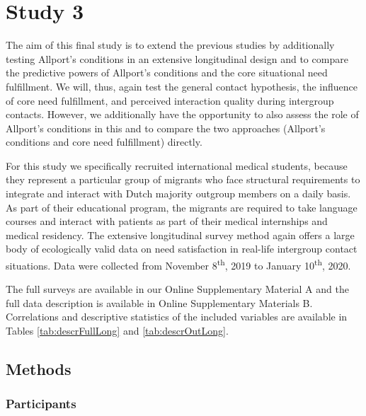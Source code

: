\documentclass[man, 12pt, a4paper]{apa7}
\theoremstyle{break}
\theoremstyle{plain}
\begin{document}
\section{Study 3}

The aim of this final study is to extend the previous studies by
additionally testing Allport's conditions in an extensive longitudinal
design and to compare the predictive powers of Allport's conditions and
the core situational need fulfillment. We will, thus, again test the
general contact hypothesis, the influence of core need fulfillment, and
perceived interaction quality during intergroup contacts. However, we
additionally have the opportunity to also assess the role of Allport's
conditions in this and to compare the two approaches (Allport's
conditions and core need fulfillment) directly.

For this study we specifically recruited international medical students,
because they represent a particular group of migrants who face
structural requirements to integrate and interact with Dutch majority
outgroup members on a daily basis. As part of their educational program,
the migrants are required to take language courses and interact with
patients as part of their medical internships and medical residency. The
extensive longitudinal survey method again offers a large body of
ecologically valid data on need satisfaction in real-life intergroup
contact situations. Data were collected from November
8\textsuperscript{th}, 2019 to January 10\textsuperscript{th}, 2020.

The full surveys are available in our Online Supplementary Material A
and the full data description is available in Online Supplementary
Materials B. Correlations and descriptive statistics of the included
variables are available in Tables \ref{tab:descrFullLong} and
\ref{tab:descrOutLong}.

\subsection{Methods}

\subsubsection{Participants}
\end{document}

